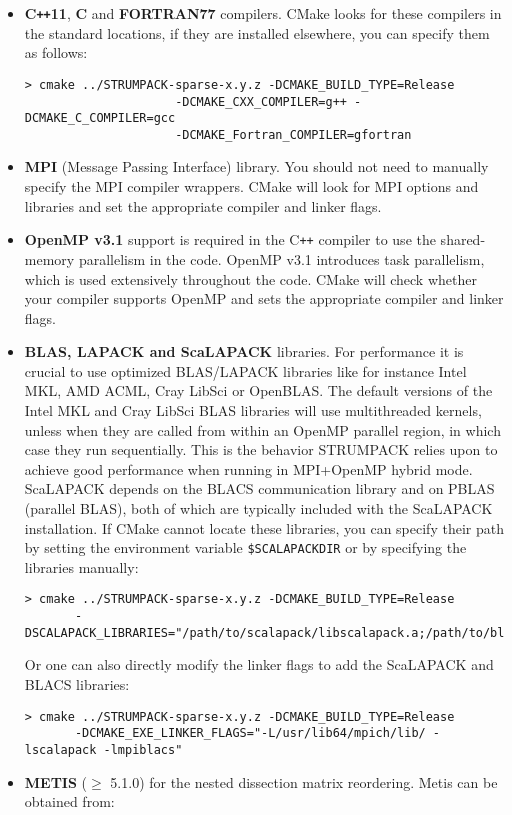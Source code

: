\documentclass{article}
\newcommand{\tm}{\textsuperscript{\textregistered}}
\begin{document}
\begin{itemize}
\item \textbf{C\texttt{++}11}, \textbf{C} and \textbf{FORTRAN77}
  compilers. CMake looks for these compilers in the standard
  locations, if they are installed elsewhere, you can specify them as
  follows:
  \begin{lstlisting}[style=Bash]
    > cmake ../STRUMPACK-sparse-x.y.z -DCMAKE_BUILD_TYPE=Release
                     -DCMAKE_CXX_COMPILER=g++ -DCMAKE_C_COMPILER=gcc
                     -DCMAKE_Fortran_COMPILER=gfortran
  \end{lstlisting}
\item \textbf{MPI} (Message Passing Interface) library.  You should
  not need to manually specify the MPI compiler wrappers.  CMake will
  look for MPI options and libraries and set the appropriate compiler
  and linker flags.
\item \textbf{OpenMP v3.1} support is required in the C\texttt{++}
  compiler to use the shared-memory parallelism in the code. OpenMP
  v3.1 introduces task parallelism, which is used extensively
  throughout the code. CMake will check whether your compiler supports
  OpenMP and sets the appropriate compiler and linker flags.
\item \textbf{BLAS, LAPACK and ScaLAPACK} libraries. For performance
  it is crucial to use optimized BLAS/LAPACK libraries like for
  instance Intel\tm{} MKL, AMD\tm{} ACML, Cray\tm{} LibSci or
  OpenBLAS. The default versions of the Intel\tm{} MKL and Cray\tm{}
  LibSci BLAS libraries will use multithreaded kernels, unless when
  they are called from within an OpenMP parallel region, in which case
  they run sequentially. This is the behavior STRUMPACK relies upon to
  achieve good performance when running in MPI+OpenMP hybrid
  mode. ScaLAPACK depends on the BLACS communication library and on
  PBLAS (parallel BLAS), both of which are typically included with the
  ScaLAPACK installation. If CMake cannot locate these libraries, you
  can specify their path by setting the environment variable
  \lstinline[style=Bash]!$SCALAPACKDIR! or by specifying the libraries
  manually:
  \begin{lstlisting}[style=Bash]
    > cmake ../STRUMPACK-sparse-x.y.z -DCMAKE_BUILD_TYPE=Release
       -DSCALAPACK_LIBRARIES="/path/to/scalapack/libscalapack.a;/path/to/blacs/libblacs.a"
  \end{lstlisting}
  Or one can also directly modify the linker flags to add the
  ScaLAPACK and BLACS libraries:
  \begin{lstlisting}[style=Bash]
    > cmake ../STRUMPACK-sparse-x.y.z -DCMAKE_BUILD_TYPE=Release
       -DCMAKE_EXE_LINKER_FLAGS="-L/usr/lib64/mpich/lib/ -lscalapack -lmpiblacs"
  \end{lstlisting}
\item \textbf{METIS} ($\geq$ 5.1.0) for the nested dissection matrix
  reordering. Metis can be obtained from:


\end{itemize}
\end{document}
